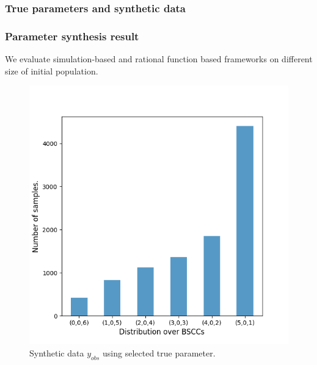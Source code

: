 \subsubsection{True parameters and synthetic data}
\subsubsection{Parameter synthesis result}
We evaluate simulation-based and rational function based frameworks on different size of initial population.
\begin{figure}[H]
    \centering
    \includegraphics[width=0.45\linewidth]{figures/sir510_data.png}
    \caption{Synthetic data $y_{obs}$ using selected true parameter.}
\end{figure}

